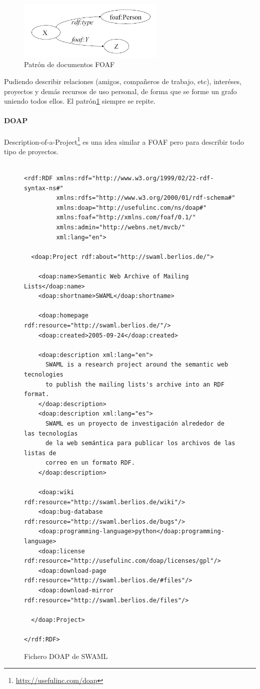 \begin{figure}[tp]
 	\centering
	\includegraphics[width=7cm]{images/patron-foaf.png}
	\caption{Patrón de documentos FOAF}
	\label{fig:patternFOAF}
\end{figure}

Pudiendo describir relaciones (amigos, compañeros de trabajo, etc), interéses,
proyectos y demás recursos de uso personal, de forma que se forme un grafo 
uniendo todos ellos. El patrón\ref{fig:patternFOAF} siempre se repite.

\paragraph{DOAP}

Description-of-a-Project\footnote{\url{http://usefulinc.com/doap}} es una idea 
similar a FOAF pero para describir todo tipo de proyectos.

\begin{figure}[p]
\begin{verbatim}

<rdf:RDF xmlns:rdf="http://www.w3.org/1999/02/22-rdf-syntax-ns#" 
         xmlns:rdfs="http://www.w3.org/2000/01/rdf-schema#" 
         xmlns:doap="http://usefulinc.com/ns/doap#" 
         xmlns:foaf="http://xmlns.com/foaf/0.1/" 
         xmlns:admin="http://webns.net/mvcb/" 
         xml:lang="en">

  <doap:Project rdf:about="http://swaml.berlios.de/">

    <doap:name>Semantic Web Archive of Mailing Lists</doap:name>
    <doap:shortname>SWAML</doap:shortname>

    <doap:homepage rdf:resource="http://swaml.berlios.de/"/>
    <doap:created>2005-09-24</doap:created>

    <doap:description xml:lang="en">
      SWAML is a research project around the semantic web tecnologies 
      to publish the mailing lists's archive into an RDF format.
    </doap:description>
    <doap:description xml:lang="es">
      SWAML es un proyecto de investigación alrededor de las tecnologías 
      de la web semántica para publicar los archivos de las listas de 
      correo en un formato RDF.
    </doap:description>

    <doap:wiki rdf:resource="http://swaml.berlios.de/wiki"/>
    <doap:bug-database rdf:resource="http://swaml.berlios.de/bugs"/>
    <doap:programming-language>python</doap:programming-language>
    <doap:license rdf:resource="http://usefulinc.com/doap/licenses/gpl"/>
    <doap:download-page rdf:resource="http://swaml.berlios.de/#files"/>
    <doap:download-mirror rdf:resource="http://swaml.berlios.de/files"/>

  </doap:Project>

</rdf:RDF>
\end{verbatim}
	\caption{Fichero DOAP de SWAML}
	\label{fig:ejemplo.doap}
\end{figure}

